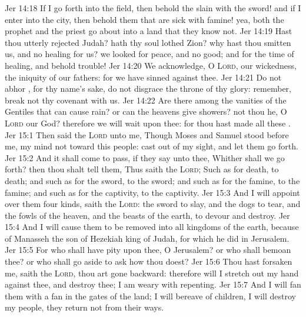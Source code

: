 \vs Jer 14:18 If I go forth into the field, then behold the slain with the sword! and if I enter into the city, then behold them that are sick with famine! yea, both the prophet and the priest go about into a land that they know not.
\vs Jer 14:19 Hast thou utterly rejected Judah? hath thy soul lothed Zion? why hast thou smitten us, and  no healing for us? we looked for peace, and  no good; and for the time of healing, and behold trouble!
\vs Jer 14:20 We acknowledge, O \textsc{Lord}, our wickedness,  the iniquity of our fathers: for we have sinned against thee.
\vs Jer 14:21 Do not abhor , for thy name's sake, do not disgrace the throne of thy glory: remember, break not thy covenant with us.
\vs Jer 14:22 Are there  among the vanities of the Gentiles that can cause rain? or can the heavens give showers?  not thou he, O \textsc{Lord} our God? therefore we will wait upon thee: for thou hast made all these .
\vs Jer 15:1 Then said the \textsc{Lord} unto me, Though Moses and Samuel stood before me,  my mind  not  toward this people: cast  out of my sight, and let them go forth.
\vs Jer 15:2 And it shall come to pass, if they say unto thee, Whither shall we go forth? then thou shalt tell them, Thus saith the \textsc{Lord}; Such as  for death, to death; and such as  for the sword, to the sword; and such as  for the famine, to the famine; and such as  for the captivity, to the captivity.
\vs Jer 15:3 And I will appoint over them four kinds, saith the \textsc{Lord}: the sword to slay, and the dogs to tear, and the fowls of the heaven, and the beasts of the earth, to devour and destroy.
\vs Jer 15:4 And I will cause them to be removed into all kingdoms of the earth, because of Manasseh the son of Hezekiah king of Judah, for  which he did in Jerusalem.
\vs Jer 15:5 For who shall have pity upon thee, O Jerusalem? or who shall bemoan thee? or who shall go aside to ask how thou doest?
\vs Jer 15:6 Thou hast forsaken me, saith the \textsc{Lord}, thou art gone backward: therefore will I stretch out my hand against thee, and destroy thee; I am weary with repenting.
\vs Jer 15:7 And I will fan them with a fan in the gates of the land; I will bereave  of children, I will destroy my people,  they return not from their ways.
